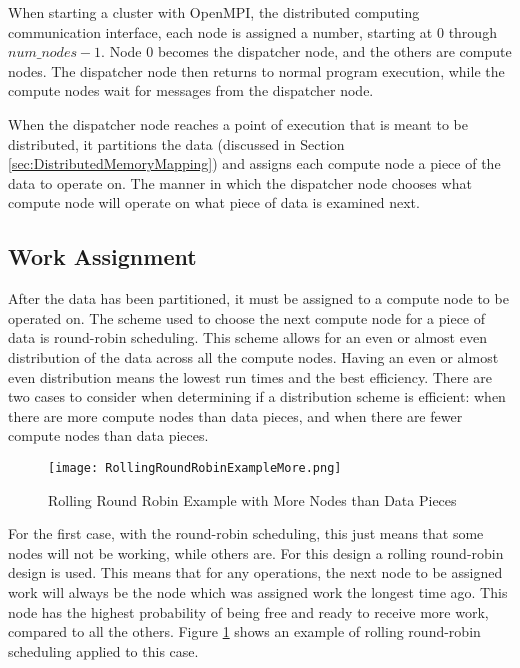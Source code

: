 When starting a cluster with OpenMPI, the distributed computing communication interface, each node is assigned a number, starting at $0$ through $num\_nodes - 1$. Node $0$ becomes the dispatcher node, and the others are compute nodes. The dispatcher node then returns to normal program execution, while the compute nodes wait for messages from the dispatcher node. 

When the dispatcher node reaches a point of execution that is meant to be distributed, it partitions the data (discussed in Section \ref{sec:DistributedMemoryMapping}) and assigns each compute node a piece of the data to operate on. The manner in which the dispatcher node chooses what compute node will operate on what piece of data is examined next.

\subsection{Work Assignment}
After the data has been partitioned, it must be assigned to a compute node to be operated on. The scheme used to choose the next compute node for a piece of data is round-robin scheduling. This scheme allows for an even or almost even distribution of the data across all the compute nodes. Having an even or almost even distribution means the lowest run times and the best efficiency. There are two cases to consider when determining if a distribution scheme is efficient: when there are more compute nodes than data pieces, and when there are fewer compute nodes than data pieces.

\begin{figure}[htp]
\centering
\texttt{[image: RollingRoundRobinExampleMore.png]}
\caption{Rolling Round Robin Example with More Nodes than Data Pieces}
\label{fig:RollingRoundRobinExampleMore}
\end{figure}
For the first case, with the round-robin scheduling, this just means that some nodes will not be working, while others are. For this design a rolling round-robin design is used. This means that for any operations, the next node to be assigned work will always be the node which was assigned work the longest time ago. This node has the highest probability of being free and ready to receive more work, compared to all the others. Figure \ref{fig:RollingRoundRobinExampleMore} shows an example of rolling round-robin scheduling applied to this case.

